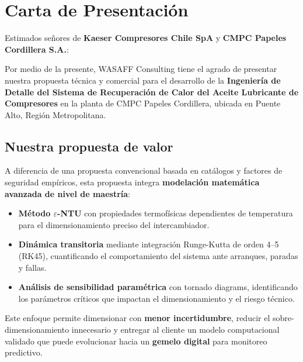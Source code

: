 \documentclass[11pt,a4paper]{article}
\begin{document}
\tableofcontents
\newpage

\section{Carta de Presentación}

Estimados señores de \textbf{Kaeser Compresores Chile SpA} y \textbf{CMPC Papeles Cordillera S.A.}:

Por medio de la presente, WASAFF Consulting tiene el agrado de presentar nuestra propuesta técnica y comercial para el desarrollo de la \textbf{Ingeniería de Detalle del Sistema de Recuperación de Calor del Aceite Lubricante de Compresores} en la planta de CMPC Papeles Cordillera, ubicada en Puente Alto, Región Metropolitana.

\subsection{Nuestra propuesta de valor}

A diferencia de una propuesta convencional basada en catálogos y factores de seguridad empíricos, esta propuesta integra \textbf{modelación matemática avanzada de nivel de maestría}:

\begin{itemize}
  \item \textbf{Método $\varepsilon$-NTU} con propiedades termofísicas dependientes de temperatura para el dimensionamiento preciso del intercambiador.
  \item \textbf{Dinámica transitoria} mediante integración Runge-Kutta de orden 4--5 (RK45), cuantificando el comportamiento del sistema ante arranques, paradas y fallas.
  \item \textbf{Análisis de sensibilidad paramétrica} con tornado diagrams, identificando los parámetros críticos que impactan el dimensionamiento y el riesgo técnico.
\end{itemize}

Este enfoque permite dimensionar con \textbf{menor incertidumbre}, reducir el sobre-dimensionamiento innecesario y entregar al cliente un modelo computacional validado que puede evolucionar hacia un \textbf{gemelo digital} para monitoreo predictivo.
\end{document}
